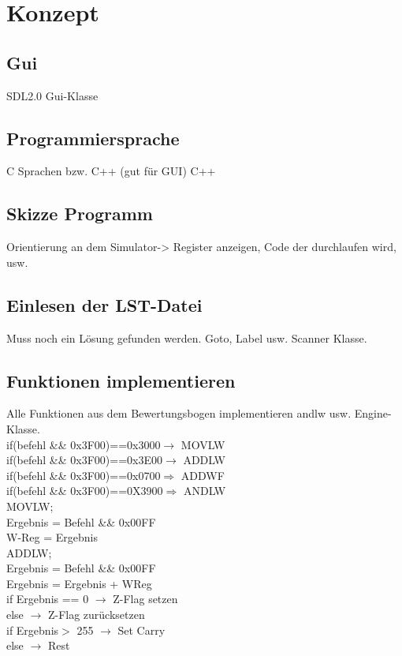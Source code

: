 \section{Konzept}


\subsection{Gui}
SDL2.0
Gui-Klasse


\subsection{Programmiersprache}
C Sprachen bzw. C++ (gut für GUI)
C++

\subsection{Skizze Programm}

Orientierung an dem Simulator-> Register anzeigen, Code der durchlaufen wird, usw.

\subsection{Einlesen der LST-Datei}
Muss noch ein Lösung gefunden werden.
Goto, Label usw.
Scanner Klasse.

\subsection{Funktionen implementieren}
Alle Funktionen aus dem Bewertungsbogen implementieren andlw usw. 
Engine-Klasse.\\
if(befehl \&\& 0x3F00)==0x3000$\longrightarrow$ MOVLW\\
if(befehl \&\& 0x3F00)==0x3E00$\longrightarrow$ ADDLW\\
if(befehl \&\& 0x3F00)==0x0700$\Longrightarrow$ ADDWF\\
if(befehl \&\& 0x3F00)==0X3900$\Longrightarrow$ ANDLW\\
MOVLW;\\
Ergebnis = Befehl \&\&  0x00FF\\
W-Reg = Ergebnis\\

ADDLW;\\
Ergebnis = Befehl \&\& 0x00FF\\
Ergebnis = Ergebnis + WReg\\
if Ergebnis == 0 $\longrightarrow$ Z-Flag setzen\\
else $\longrightarrow$ Z-Flag zurücksetzen\\
if Ergebnis$>$ 255 $\longrightarrow$ Set Carry\\
else $\longrightarrow$ Rest \\

